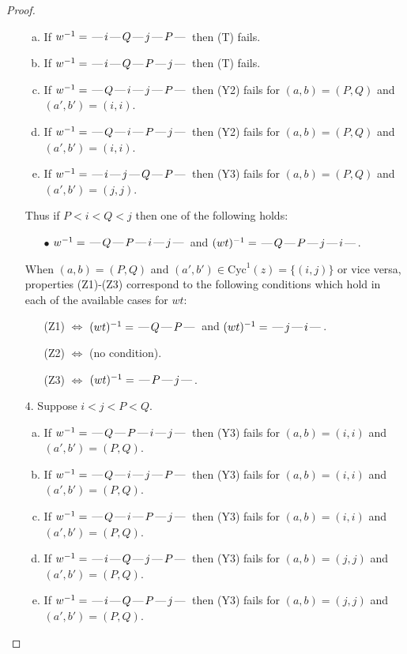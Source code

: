 \documentclass[10pt]{article}
\theoremstyle{definition}
\theoremstyle{definition}
\def\dash{\text{\hspace{0.5mm}---\hspace{0.5mm}}}
\def\Cyc{\mathrm{Cyc}}
\begin{document}
\begin{proof}
\begin{enumerate}
\begin{enumerate}[(a)]
\item If $w^{-1} = \dash i\dash Q\dash j\dash P\dash $ then (T) fails.
\item If $w^{-1} = \dash i\dash Q\dash P\dash j\dash $ then (T) fails.
\item If $w^{-1} = \dash Q\dash i\dash j\dash P\dash $ then (Y2) fails for $(a,b)=(P,Q)$ and $(a',b')=(i,i)$.
\item If $w^{-1} = \dash Q\dash i\dash P\dash j\dash $ then (Y2) fails for $(a,b)=(P,Q)$ and $(a',b')=(i,i)$.
\item If $w^{-1} = \dash i\dash j\dash Q\dash P\dash $ then (Y3) fails for $(a,b)=(P,Q)$ and $(a',b')=(j,j)$.
\end{enumerate}
Thus if $P < i < Q < j$ then one of the following holds:
\begin{enumerate}
\item[$\bullet$] $w^{-1} = \dash Q\dash P\dash i\dash j\dash $ and $(wt)^{-1} = \dash Q\dash P\dash j\dash i\dash $.
\end{enumerate}
When $(a,b)= (P,Q)$ and $(a',b')\in \Cyc^1(z)=\{(i,j)\}$ or vice versa,
properties (Z1)-(Z3) correspond to the following conditions which
hold in each of the available cases for $wt$:
\begin{enumerate}
\item[](Z1) $\Leftrightarrow$ $(wt)^{-1} = \dash Q \dash P \dash$  and $(wt)^{-1} = \dash j \dash i \dash$.
\item[](Z2) $\Leftrightarrow$ (no condition).
\item[](Z3) $\Leftrightarrow$ $(wt)^{-1} = \dash P \dash j \dash$.
\end{enumerate}
\item[$4$.] Suppose $i < j < P < Q$.
\begin{enumerate}[(a)]
\item If $w^{-1} = \dash Q\dash P\dash i\dash j\dash $ then (Y3) fails for $(a,b)=(i,i)$ and $(a',b')=(P,Q)$.
\item If $w^{-1} = \dash Q\dash i\dash j\dash P\dash $ then (Y3) fails for $(a,b)=(i,i)$ and $(a',b')=(P,Q)$.
\item If $w^{-1} = \dash Q\dash i\dash P\dash j\dash $ then (Y3) fails for $(a,b)=(i,i)$ and $(a',b')=(P,Q)$.
\item If $w^{-1} = \dash i\dash Q\dash j\dash P\dash $ then (Y3) fails for $(a,b)=(j,j)$ and $(a',b')=(P,Q)$.
\item If $w^{-1} = \dash i\dash Q\dash P\dash j\dash $ then (Y3) fails for $(a,b)=(j,j)$ and $(a',b')=(P,Q)$.
\end{enumerate}

\end{enumerate}
\end{proof}
\end{document}
